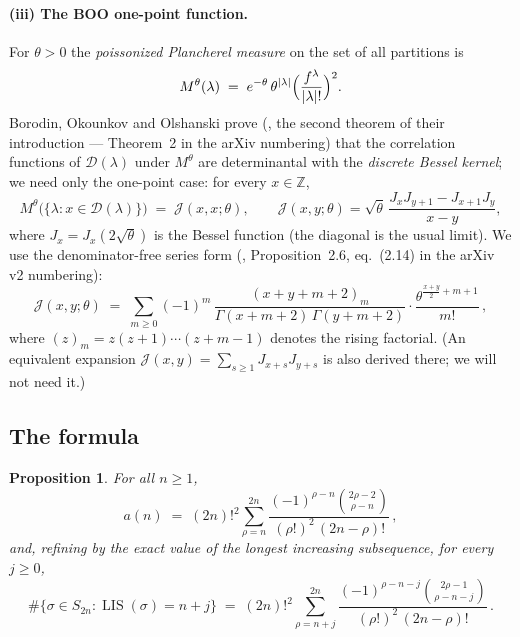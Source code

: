 \documentclass[11pt]{article}
\theoremstyle{plain}
\newtheorem{proposition}[theorem]{Proposition}
\theoremstyle{definition}
\theoremstyle{remark}
\newcommand{\LIS}{\operatorname{LIS}}
\newcommand{\Dset}{\mathcal{D}}
\newcommand{\JJ}{\mathcal{J}}
\newcommand{\ZZ}{\mathbb{Z}}
\begin{document}
\paragraph{(iii) The BOO one-point function.} For $\theta>0$ the \emph{poissonized Plancherel
measure} on the set of all partitions is
\[
  M^\theta(\lambda)\;=\;e^{-\theta}\,\theta^{|\lambda|}\Bigl(\frac{f^\lambda}{|\lambda|!}\Bigr)^{2}.
\]
Borodin, Okounkov and Olshanski prove (\cite{BOO00}, the second theorem of their introduction
--- Theorem~2 in the arXiv numbering) that the correlation functions of $\Dset(\lambda)$ under
$M^\theta$ are determinantal with the \emph{discrete Bessel kernel}; we need only the one-point
case: for every $x\in\ZZ$,
\begin{equation}\label{eq:boo}
  M^\theta\bigl(\{\lambda : x\in\Dset(\lambda)\}\bigr)\;=\;\JJ(x,x;\theta),
  \qquad
  \JJ(x,y;\theta)=\sqrt{\theta}\,\frac{J_x J_{y+1}-J_{x+1}J_y}{x-y},
\end{equation}
where $J_x=J_x(2\sqrt\theta)$ is the Bessel function (the diagonal is the usual limit). We use
the denominator-free series form (\cite{BOO00}, Proposition~2.6, eq.~(2.14) in the arXiv v2
numbering):
\begin{equation}\label{eq:kernelseries}
  \JJ(x,y;\theta)\;=\;\sum_{m\ge0}(-1)^m\,
  \frac{(x+y+m+2)_m}{\Gamma(x+m+2)\,\Gamma(y+m+2)}\cdot\frac{\theta^{\frac{x+y}{2}+m+1}}{m!}\,,
\end{equation}
where $(z)_m=z(z{+}1)\cdots(z{+}m{-}1)$ denotes the rising factorial. (An equivalent
expansion $\JJ(x,y)=\sum_{s\ge1}J_{x+s}J_{y+s}$ is also derived there; we will not
need it.)

\subsection{The formula}

\begin{proposition}\label{prop:rep}
For all $n\ge1$,
\begin{equation}\label{eq:staragain}
  a(n) \;=\; (2n)!^{2}\sum_{\rho=n}^{2n}
  \frac{(-1)^{\rho-n}\binom{2\rho-2}{\rho-n}}{(\rho!)^{2}\,(2n-\rho)!}\,,
\end{equation}
and, refining by the exact value of the longest increasing subsequence, for every $j\ge0$,
\begin{equation}\label{eq:starprime}
  \#\{\sigma\in S_{2n} : \LIS(\sigma)=n+j\}
  \;=\;(2n)!^{2}\sum_{\rho=n+j}^{2n}
  \frac{(-1)^{\rho-n-j}\binom{2\rho-1}{\rho-n-j}}{(\rho!)^{2}\,(2n-\rho)!}\,.
\end{equation}
\end{proposition}
\end{document}
